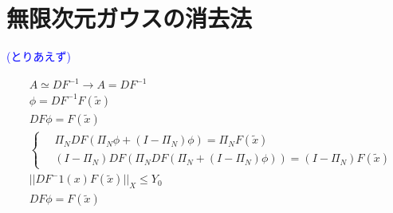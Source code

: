 \documentclass[11pt,a4paper]{jsarticle}
\theoremstyle{definition}
\begin{document}
\section{無限次元ガウスの消去法}

\textcolor{blue}{(とりあえず)}

\begin{align*}
   & A \simeq DF^{-1} \rightarrow A = DF^{-1} \\
   & \phi = DF^{-1}F(\tilde{x})               \\
   & DF\phi = F(\tilde{x})                    \\
   & \left\{ \,
  \begin{aligned}
     & \Pi_N DF ( \Pi_N \phi + (I-\Pi_N) \phi ) = \Pi_N F(\tilde{x})             \\
     & (I-\Pi_N) DF (\Pi_N DF (\Pi_N + (I-\Pi_N) \phi)) = (I-\Pi_N) F(\tilde{x})
  \end{aligned}
  \right.                                     \\
   & ||DF^-1(x)F(\tilde{x})||_X \leq Y_0      \\
   & DF \phi = F(\tilde{x})
\end{align*}
\end{document}
